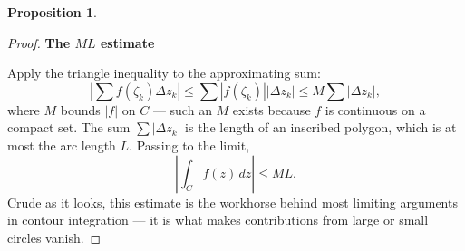 \documentclass[11pt,a4paper]{article}
\theoremstyle{definition}
\newtheorem{proposition}[thm]{Proposition}
\newcommand{\subhead}[1]{%
  \par\medskip\noindent\textbf{#1}\par\nobreak\smallskip}
\begin{document}
\begin{proposition}
\begin{enumerate}
\begin{proof}
\subhead{The $ML$ estimate}
Apply the triangle inequality to the approximating sum:
$$\left|\sum f(\zeta_k)\Delta z_k\right|\leq\sum\left|f(\zeta_k)\right|
\left|\Delta z_k\right|\leq M\sum\left|\Delta z_k\right| ,$$
where $M$ bounds $\left|f\right|$ on $C$ --- such an $M$ exists because $f$ is
continuous on a compact set. The sum $\sum\left|\Delta z_k\right|$ is the length
of an inscribed polygon, which is at most the arc length $L$. Passing to the
limit,
$$\left|\int_C f(z)\,dz\right|\leq ML .$$
Crude as it looks, this estimate is the workhorse behind most limiting
arguments in contour integration --- it is what makes contributions from large
or small circles vanish.
\end{proof}
\end{enumerate}
\end{proposition}
\end{document}
